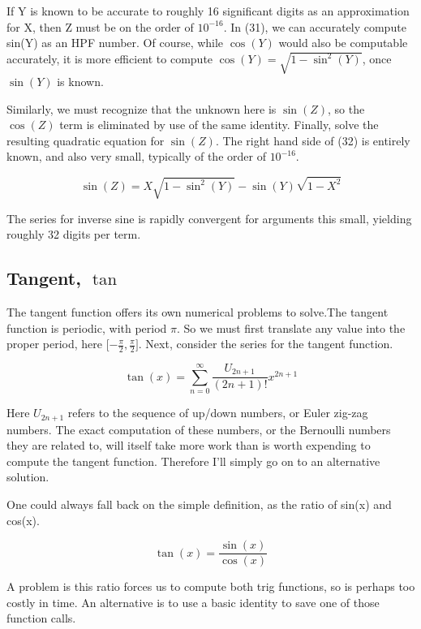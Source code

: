 \documentclass[a4paper,12pt]{article}
\begin{document}
If Y is known to be accurate to roughly 16 significant digits as an approximation for X, then Z must be on the order of $10^{-16}$. In (31), we can accurately compute sin(Y) as an HPF number. Of course, while $\cos(Y)$ would also be computable accurately, it is more efficient to compute $\cos(Y) = \sqrt{1-\sin^2(Y)}$, once $\sin(Y)$ is known.

Similarly, we must recognize that the unknown here is $\sin(Z)$, so the $\cos(Z)$ term is eliminated by use of the same identity. Finally, solve the resulting quadratic equation for $\sin(Z)$. The right hand side of (32) is entirely known, and also very small, typically of the order of $10^{-16}$.

\begin{equation}
   \sin(Z) = X\sqrt{1-\sin^2(Y)} - \sin(Y) \sqrt{1 - X^2}
\end{equation}

The series for inverse sine is rapidly convergent for arguments this small, yielding roughly 32 digits per term.

\subsection{Tangent, $\tan$}

The tangent function offers its own numerical problems to solve.The tangent function is periodic, with period $\pi$. So we must first translate any value into the proper period, here [$-\frac{\pi}{2},\frac{\pi}{2}]$. Next, consider the series for the tangent function.

\begin{equation}
   \tan(x) =  \sum_{n = 0}^{\infty} \frac{U_{2n+1}}{(2n+1)!} x^{2n+1}
\end{equation}

Here $U_{2n+1}$ refers to the sequence of up/down numbers, or Euler zig-zag numbers. The exact computation of these numbers, or the Bernoulli numbers they are related to, will itself take more work than is worth expending to compute the tangent function. Therefore I'll simply go on to an alternative solution.

One could always fall back on the simple definition, as the ratio of sin(x) and cos(x).

\begin{equation}
   \tan(x) = \frac{\sin(x)}{\cos(x)}
\end{equation}

A problem is this ratio forces us to compute both trig functions, so is perhaps too costly in time. An alternative is to use a basic identity to save one of those function calls.
\end{document}
